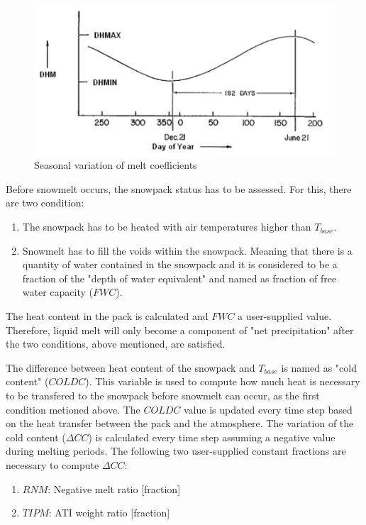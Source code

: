 \begin{figure}[h]
    \centering
	\includegraphics[scale=0.55]{figures/snowmelt_DHM.png}
	\caption{Seasonal variation of melt coefficients \cite{Rossman2016}}
	\label{fig:meltcoeff}
\end{figure}

 Before snowmelt occurs, the snowpack status has to be assessed. For this, there are two condition:
 \begin{enumerate}
    \item The snowpack has to be heated with air temperatures higher than $T_{base}$.
    \item Snowmelt has to fill the voids within the snowpack. Meaning that there is a quantity of water contained in the snowpack and it is considered to be a fraction of the "depth of water equivalent" and named as fraction of free water capacity ($FWC$). 
\end{enumerate}
  
The heat content in the pack is calculated and $FWC$ a user-supplied value. Therefore, liquid melt will only become a component of "net precipitation" after the two conditions, above mentioned, are satisfied.

 The difference between heat content of the snowpack and $T_{base}$ is named as "cold content" ($COLDC$). This variable is used to compute how much heat is necessary to be transfered to the snowpack before snowmelt can occur, as the first condition metioned above. The $COLDC$ value is updated every time step based on the heat transfer between the pack and the atmosphere. The variation of the cold content ($\Delta CC$) is calculated every time step assuming a negative value during melting periods. The following two user-supplied constant fractions are necessary to compute $\Delta CC$:
\begin{enumerate}
    \item $RNM$: Negative melt ratio [fraction]
    \item $TIPM$: ATI weight ratio [fraction]
\end{enumerate}

